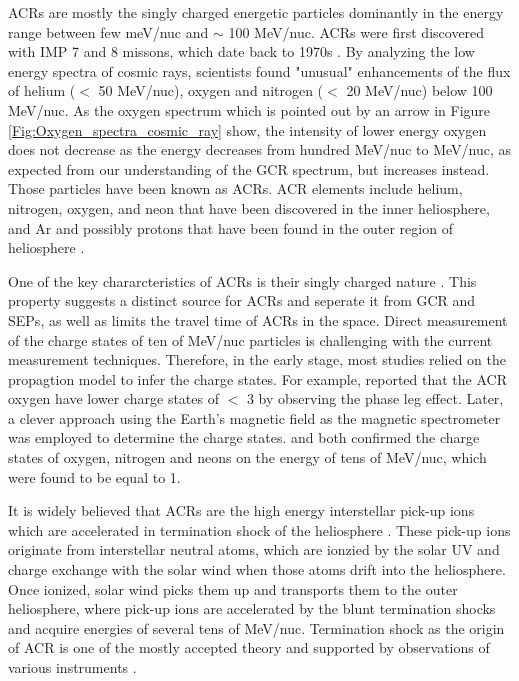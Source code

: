 \acp{ACR} are mostly the singly charged energetic particles dominantly in the energy range between few meV/nuc and $\sim$ 100 MeV/nuc. \acp{ACR} were first discovered with \ac{IMP} 7 and 8 missons, which date back to 1970s \citep{Garcia1973ICRC, Hoverstadt1973PhRvL, McDonald1974ApJ}. By analyzing the low energy spectra of cosmic rays, scientists found "unusual" enhancements of the flux of helium ($<$ 50 MeV/nuc), oxygen and nitrogen ($<$ 20 MeV/nuc) below 100 MeV/nuc. As the oxygen spectrum which is pointed out by an arrow in Figure \ref{Fig:Oxygen_spectra_cosmic_ray} show, the intensity of lower energy oxygen does not decrease as the energy decreases from hundred MeV/nuc to MeV/nuc, as expected from our understanding of the \ac{GCR} spectrum, but increases instead. Those particles have been known as \acp{ACR}. \ac{ACR} elements include helium, nitrogen, oxygen, and neon that have been discovered in the inner heliosphere, and Ar and possibly protons that have been found in the outer region of heliosphere \citep{Klecker1995SSRv}.

One of the key chararcteristics of \acp{ACR} is their singly charged nature \citep{Klecker1980GeoRL,Adams1991ApJ, Klecker1995ApJ}. This property suggests a distinct source for \acp{ACR} and seperate it from \ac{GCR} and \acp{SEP}, as well as limits the travel time of \acp{ACR} in the space. Direct measurement of the charge states of ten of MeV/nuc particles is challenging with the current measurement techniques. Therefore, in the early stage, most studies relied on the propagtion model to infer the charge states. For example, \citet{Klecker1980GeoRL} reported that the \ac{ACR} oxygen have lower charge states of $<$ 3 by observing the phase leg effect. Later, a clever approach using the Earth's magnetic field as the magnetic spectrometer was employed to determine the charge states. \citet{Adams1991ApJ} and \citet{Klecker1995ApJ} both confirmed the charge states of oxygen, nitrogen and neons on the energy of tens of MeV/nuc, which were found to be equal to 1.

It is widely believed that \acp{ACR} are the high energy interstellar pick-up ions which are accelerated in termination shock of the heliosphere \citep{Fisk1974ApJ}. These pick-up ions originate from interstellar neutral atoms, which are ionzied by the solar \ac{UV} and charge exchange with the solar wind when those atoms drift into the heliosphere. Once ionized, solar wind picks them up and transports them to the outer heliosphere, where pick-up ions are accelerated by the blunt termination shocks \citep{McComas2006GeoRL} and acquire energies of several tens of MeV/nuc. Termination shock as the origin of \ac{ACR} is one of the mostly accepted theory and supported by observations of various instruments \citep{McComas2019ApJ, Cummings2019ICRC}. 


